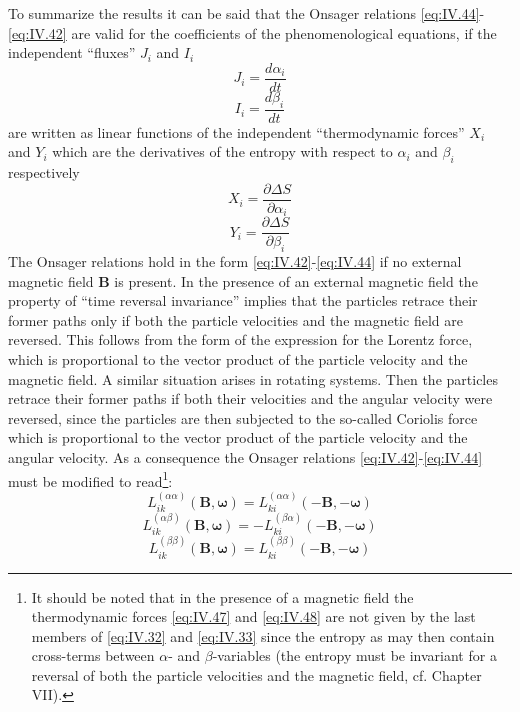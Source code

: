 To summarize the results it can be said that the Onsager relations \eqref{eq:IV.44}-\eqref{eq:IV.42} are valid for the coefficients of the phenomenological equations, if the independent ``fluxes'' $J_i$ and $I_i$
\begin{equation}
J_i = \frac{d \alpha_i}{d t}
    \label{eq:IV.45}
\end{equation}
\begin{equation}
I_i = \frac{d \beta_i}{d t}
    \label{eq:IV.46}
\end{equation}
are written as linear functions of the independent ``thermodynamic forces'' $X_i$ and $Y_i$ which are the derivatives of the entropy with respect to $\alpha_i$ and $\beta_i$
respectively
\begin{equation}
X_i = \frac{\partial \Delta S}{\partial \alpha_i}
    \label{eq:IV.47}
\end{equation}
\begin{equation}
Y_i = \frac{\partial \Delta S}{\partial \beta_i}
    \label{eq:IV.48}
\end{equation}
The Onsager relations hold in the form \eqref{eq:IV.42}-\eqref{eq:IV.44} if no external magnetic field $\bm{B}$ is present. In the presence of an external magnetic field the property of ``time reversal invariance'' implies that the particles retrace their former paths only if both the particle velocities and the magnetic field are reversed. This follows from the form of the expression for the Lorentz force, which is proportional to the vector product of the particle velocity and the magnetic field. A similar situation arises in rotating systems. Then the particles retrace their former paths if both their velocities and the angular velocity were reversed, since the particles are then subjected to the so-called Coriolis force which is proportional to the vector product of the particle velocity and the angular velocity. As a consequence the Onsager relations \eqref{eq:IV.42}-\eqref{eq:IV.44} must be modified to read\footnote{It should be noted that in the presence of a magnetic field the thermodynamic forces \eqref{eq:IV.47} and \eqref{eq:IV.48} are not given by the  last members of \eqref{eq:IV.32} and \eqref{eq:IV.33} since the entropy as may then contain cross-terms between $\alpha$- and $\beta$-variables (the entropy must be invariant for a reversal of both the particle velocities and the magnetic
field, cf. Chapter VII).}:
\begin{equation}
L_{ik}^{(\alpha \alpha)} (\bm{B}, \bm{\omega}) = L_{ki}^{(\alpha \alpha)} (-\bm{B}, -\bm{\omega})
    \label{eq:IV.49}
\end{equation}
\begin{equation}
L_{ik}^{(\alpha \beta)} (\bm{B}, \bm{\omega}) = -L_{ki}^{(\beta \alpha)} (-\bm{B}, -\bm{\omega})
    \label{eq:IV.50}
\end{equation}
\begin{equation}
L_{ik}^{(\beta \beta)} (\bm{B}, \bm{\omega}) = L_{ki}^{(\beta \beta)} (-\bm{B}, -\bm{\omega})
    \label{eq:IV.51}
\end{equation}

